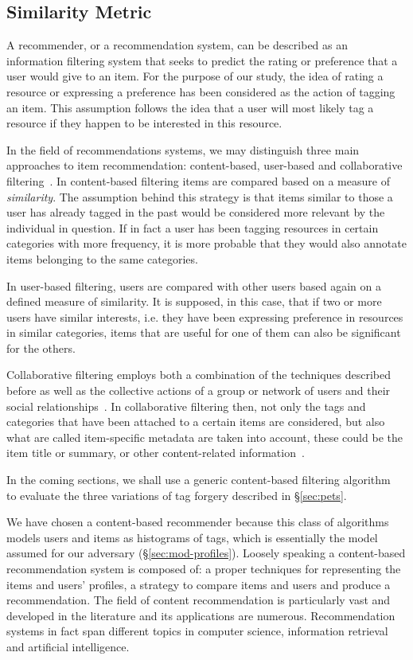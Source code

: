 \subsection{Similarity Metric}
A recommender, or a recommendation system, can be described as an information filtering system that seeks to predict the rating or preference that a user would give to an item. For the purpose of our study, the idea of rating a resource or expressing a preference has been considered as the action of tagging an item. This assumption follows the idea that a user will most likely tag a resource if they happen to be interested in this resource.

In the field of recommendations systems, we may distinguish three main approaches to item recommendation: content-based, user-based and collaborative filtering~\cite{a25}.
In content-based filtering items are compared based on a measure of \emph{similarity}. The assumption behind this strategy is that items similar to those a user has already tagged in the past would be considered more relevant by the individual in question. If in fact a user has been tagging resources in certain categories with more frequency, it is more probable that they would also annotate items belonging to the same categories.

In user-based filtering, users are compared with other users based again on a defined measure of similarity. It is supposed, in this case, that if two or more users have similar interests, i.e. they have been expressing preference in resources in similar categories, items that are useful for one of them can also be significant for the others.

Collaborative filtering employs both a combination of the techniques described before as well as the collective actions of a group or network of users and their social relationships~\cite{collfilt}. In collaborative filtering then, not only the tags and categories that have been attached to a certain items are considered, but also what are called item-specific metadata are taken into account, these could be the item title or summary, or other content-related information~\cite{a04}.

In the coming sections, we shall use a generic content-based filtering algorithm~\cite{Lops11B} to evaluate the three variations of tag forgery described in \S \ref{sec:pets}. 

We have chosen a content-based recommender because this class of algorithms models users and items as histograms of tags, which is essentially the model assumed for our adversary (\S  \ref{sec:mod-profiles}). Loosely speaking a content-based recommendation system is composed of: a proper techniques for representing the items and users' profiles, a strategy to compare items and users and produce a recommendation. The field of content recommendation is particularly vast and developed in the literature and its applications are numerous. Recommendation systems in fact span different topics in computer science, information retrieval and artificial intelligence. 

